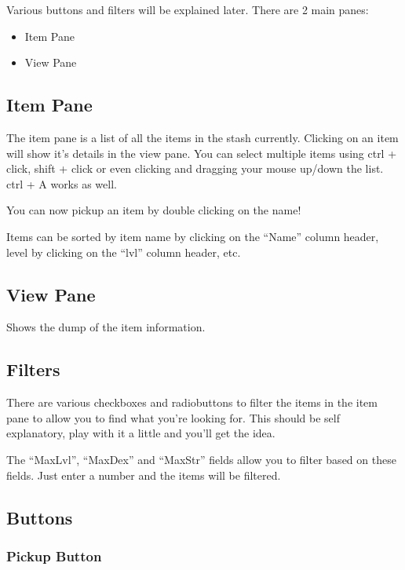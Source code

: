 \documentclass[a4paper,10pt]{article}
\begin{document}
Various buttons and filters will be explained later. There are 2 main panes:

\begin{itemize}
 \item Item Pane
 \item View Pane
\end{itemize}

\subsection{Item Pane}

The item pane is a list of all the items in the stash currently. Clicking on an item will show it's details in the view pane. You can select multiple items using ctrl + click, shift + click or even clicking and dragging your mouse up/down the list. ctrl + A works as well.

You can now pickup an item by double clicking on the name!

Items can be sorted by item name by clicking on the ``Name'' column header, level by clicking on the ``lvl'' column header, etc.

\subsection{View Pane}

Shows the dump of the item information.

\subsection{Filters}

There are various checkboxes and radiobuttons to filter the items in the item pane to allow you to find what you're looking for. This should be self explanatory, play with it a little and you'll get the idea.

The ``MaxLvl'', ``MaxDex'' and ``MaxStr'' fields allow you to filter based on these fields. Just enter a number and the items will be filtered.

\subsection{Buttons}

\subsubsection{Pickup Button}
\end{document}
